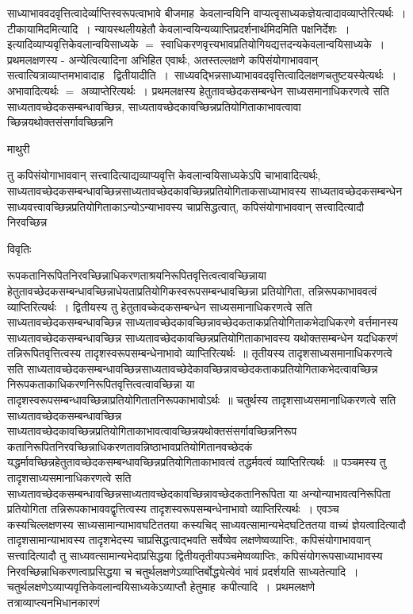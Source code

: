 \documentclass[10pt, openany]{book}
\begin{document}
{साध्याभाववदवृत्तित्वादेर्व्याप्तिस्वरूपत्वाभावे बीजमाह~केवलान्वयिनि वाप्यत्वृसाध्यकज्ञेयत्वादावव्याप्तेरित्यर्थः~।
टीकायामिदमित्यादि~। न्यायस्थलीयहेतौ केवलान्वयिन्यव्याप्तिप्रदर्शनार्थमिदमिति पक्षनिर्देशः~। इत्यादिव्याप्यवृत्तिकेवलान्वयिसाध्यके $=$ स्वाधिकरणवृत्त्यभावप्रतियोगियद्यत्तदन्यकेवलान्वयिसाध्यके~। प्रथमलक्षणस्य -  अन्येत्वित्यादिना अभिहित एवार्थः, अतस्तल्लक्षणे कपिसंयोगाभाववान् सत्वात्यित्राव्याप्तमभावादाह \textemdash\ {\qt द्वितीयादीति~।}~साध्यवद्भिन्नसाध्याभाववदवृत्तित्वादिलक्षणचतुष्टयस्येत्यर्थः~।अभावादित्यर्थः $=$ अव्याप्तेरित्यर्थः~। प्रथमलक्षस्य हेतुतावच्छेदकसम्बन्धेन साध्यसमानाधिकरणत्वे सति साध्यतावच्छेदकसम्बन्धावच्छिन्न, साध्यतावच्छेदकावच्छिन्नप्रतियोगिताकाभावत्वावा च्छिन्नयथोक्तसंसर्गावच्छिन्ननि
\newpage
\begin{center}  माथुरी  \end{center} 
{\la तु कपिसंयोगाभाववान् सत्त्वादित्याद्यव्याप्यवृत्ति केवलान्वयिसाध्यकेऽपि चाभावादित्यर्थः, साध्यतावच्छेदकसम्बन्धावच्छिन्नसाध्यतावच्छेदकावच्छिन्नप्रतियोगिताकसाध्याभावस्य साध्यतावच्छेदकसम्बन्धेन साध्यवत्त्वावच्छिन्नप्रतियोगिताकाऽन्योऽन्याभावस्य 
चाप्रसिद्धत्वात्, कपिसंयोगाभाववान् सत्त्वादित्यादौ निरवच्छिन्न}
 \begin{center}     विवृतिः \end{center} 
रूपकतानिरूपितनिरवच्छिन्नाधिकरणताश्रयनिरूपितवृत्तित्वत्वावच्छिन्नाया हेतुतावच्छेदकसम्बन्धावच्छिन्नाधेयताप्रतियोगिकस्वरूपसम्बन्धावच्छिन्ना
प्रतियोगिता, तन्निरूपकाभाववत्वं व्याप्तिरित्यर्थः~। {\qt द्वितीयस्य तु} हेतुतावच्केदकसम्बन्धेन साध्यसमानाधिकरणत्वे सति साध्यतावच्छेदकसम्बन्धावच्छिन्न साध्यतावच्छेदकावच्छिन्नावच्छेदकताकप्रतियोगिताकभेदाधिकरणे वर्त्तमानस्य साध्यतावच्छेदकसम्बन्धावच्छिन्न साध्यतावच्छेदकावच्छिन्नप्रतियोगिताकाभावस्य यथोक्तसम्बन्धेन यदधिकरणं तन्निरूपितवृत्तित्वस्य तादृशस्वरूपसम्बन्धेनाभावो
व्याप्तिरित्यर्थः~॥ {\qt तृतीयस्य}  तादृशसाध्यसमानाधिकरणत्वे सति साध्यतावच्छेदकसम्बन्धावच्छिन्नसाध्यतावच्छेदेकावच्छिन्नावच्छेदकताकप्रतियोगिताकभेदत्वावच्छिन्न निरूपकताकाधिकरणनिरूपितवृत्तित्वत्वावच्छिन्ना या
तादृशस्वरूपसम्बन्धावच्छिन्नाप्रतियोगितातनिरूपकाभावोऽर्थः~॥ {\qt चतुर्थस्य} तादृशसाध्यसमानाधिकरणत्वे सति साध्यतावच्छेदकसम्बन्धावच्छिन्न साध्यतावच्छेदकावच्छिन्नप्रतियोगिताकाभावत्वावच्छिन्नयथोक्तसंसर्गावच्छिन्ननिरूप कतानिरूपितनिरवच्छिन्नाधिकरणतावन्निष्ठाभावप्रतियोगितानवच्छेदकं यद्धर्मावच्छिन्नहेतुतावच्छेदकसम्बन्धावच्छिन्नप्रतियोगिताकाभावत्वं तद्धर्मवत्वं व्याप्तिरित्यर्थः~॥  पञ्चमस्य \textendash  तु
तादृशसाध्यसमानाधिकरणत्वे सति साध्यतावच्छेदकसम्बन्धावच्छिन्नसाध्यतावच्छेदकावच्छिन्नावच्छेदकतानिरूपिता या अन्योन्याभावत्वनिरूपिता प्रतियोगिता तन्निरूपकाभाववद्वृत्तित्वस्य तादृशस्वरूपसम्बन्धेनाभावो व्याप्तिरित्यर्थः~। एवञ्च कस्यचिल्लक्षणस्य साध्यसामान्याभावघटिततया कस्यचिद् साध्यवत्सामान्यभेदघटिततया वाच्यं ज्ञेयत्वादित्यादौ तादृशसामान्याभावस्य तादृशभेदस्य चाप्रसिद्धत्वाद्भवति सर्वेष्वेव लक्षणेष्वव्याप्तिः, कपिसंयोगाभाववान् सत्त्वादित्यादौ तु साध्यवत्सामान्यभेदाप्रसिद्धया द्वितीयतृतीयपञ्चमेष्वव्याप्तिः, कपिसंयोगरूपसाध्याभावस्य निरवच्छिन्नाधिकरणत्वाप्रसिद्धया च चतुर्थलक्षणेऽव्याप्तिर्बोद्ध्येत्येवं भावं प्रदर्शयति {\la साध्यतेत्यादि~।} चतुर्थलक्षणेऽव्याप्यवृत्तिकेवलान्वयिसाध्यकेऽव्याप्तौ हेतुमाह\textemdash\ {\qt  कपीत्यादि~।}~प्रथमलक्षणे तत्राव्याप्त्यनभिधानकारणं
}
\end{document}
